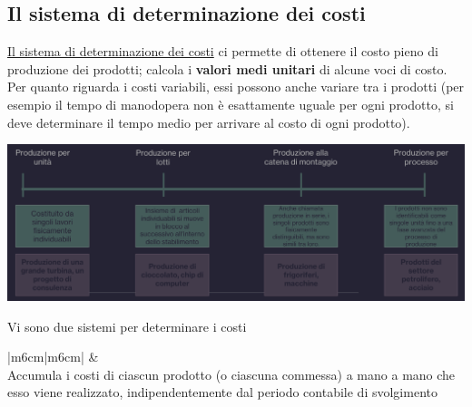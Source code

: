 \documentclass{article}
\begin{document}
\subsection{Il sistema di determinazione dei costi}
\underline{Il sistema di determinazione dei costi} ci permette di ottenere il costo pieno di produzione dei prodotti; calcola i \textbf{valori medi unitari} di alcune voci di costo. Per quanto riguarda i costi variabili, essi possono anche variare tra i prodotti (per esempio il tempo di manodopera non è esattamente uguale per ogni prodotto, si deve determinare il tempo medio per arrivare al costo di ogni prodotto).
\begin{center}
    \includegraphics[scale=0.3]{Image/SistCosti_1.png}
\end{center}
Vi sono due sistemi per determinare i costi
\begin{center}
\begin{tabular}{|m{6cm}|m{6cm}|}
    \hline 
    & \\ \hline 
    Accumula i costi di ciascun prodotto (o ciascuna commessa) a mano a mano che esso viene realizzato, indipendentemente dal periodo contabile di svolgimento
\end{tabular}
\end{center}
\end{document}
